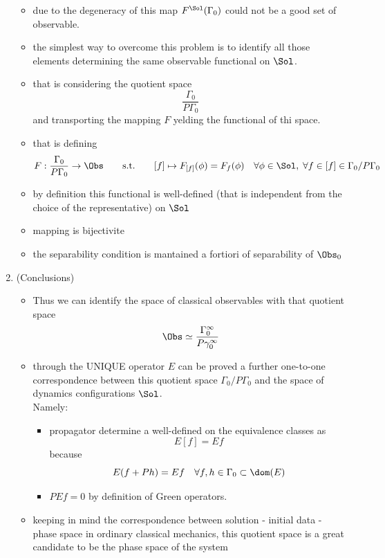 \documentclass[a4paper,11pt]{scrartcl}
\begin{document}
\begin{enumerate}
\begin{itemize}
				\item due to the degeneracy of this map $F^\Sol(\Gamma_0)$ could not be a good set of observable.
				\item the simplest way to overcome this problem is to identify all those elements determining the same observable functional on $\Sol$.
				\item that is considering the quotient space $$\frac{\Gamma_0}{P \Gamma_0}$$
				and transporting the mapping $F$ yelding the functional of thi space.
				\item that is defining
				$$F: \frac{\Gamma_0}{P \Gamma_0} \rightarrow \Obs \qquad 
				\textrm{s.t.} \qquad
				[f] \mapsto F_{[f]}(\phi) = F_f(\phi) \quad 
				\forall \phi \in \Sol , \; \forall f \in [f] \in \Gamma_0 / P \Gamma_0 $$
				\item by definition this functional is well-defined (that is independent from the choice of the representative) on $\Sol$
				\item mapping is bijectivite
				\item the separability condition is mantained a fortiori of separability of $\Obs_0$
			\end{itemize}
		\item (Conclusions)
			\begin{itemize}
				\item Thus we can identify the space of classical observables with that quotient space
				$$ \Obs \simeq \frac{\Gamma_0^\infty}{P \gamma_0^\infty} $$
				\item through the UNIQUE operator $E$ can be proved a further one-to-one correspondence between this quotient space $\Gamma_0 / P \Gamma_0$ and the space of dynamics configurations $\Sol$.\\
				Namely:
				\begin{itemize}
					\item propagator determine a  well-defined on the equivalence classes as  
					$$ E[f] =  E f $$
					because
					$$ E(f + P h ) = E f  \quad \forall f,h \in \Gamma_0 \subset \dom(E)$$
					\item $ P E f = 0 $ by definition of Green operators.
				\end{itemize}
				\item keeping in mind the correspondence between solution  - initial data  - phase space in ordinary classical mechanics,
				this quotient space is a great candidate  to be the phase space of the system
			\end{itemize}
	\end{enumerate}
\end{document}
